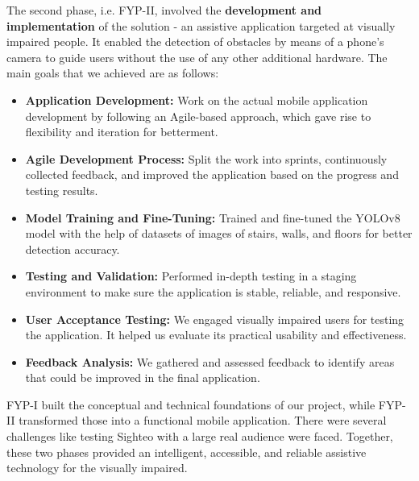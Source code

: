 \documentclass{FastFyp}
\begin{document}
The second phase, i.e. FYP-II, involved the \textbf{development and implementation} of the solution - an assistive application targeted at visually impaired people. It enabled the detection of obstacles by means of a phone's camera to guide users without the use of any other additional hardware. The main goals that we achieved are as follows:

\begin{itemize}
    \item \textbf{Application Development:}
    Work on the actual mobile application development by following an Agile-based approach, which gave rise to flexibility and iteration for betterment.
    \item \textbf{Agile Development Process:}
    Split the work into sprints, continuously collected feedback, and improved the application based on the progress and testing results.
    \item \textbf{Model Training and Fine-Tuning:}
    Trained and fine-tuned the YOLOv8 model with the help of datasets of images of stairs, walls, and floors for better detection accuracy.
    \item \textbf{Testing and Validation:}
     Performed in-depth testing in a staging environment to make sure the application is stable, reliable, and responsive.
     \item \textbf{User Acceptance Testing:}
     We engaged visually impaired users for testing the application. It helped us evaluate its practical usability and effectiveness.
     \item \textbf{Feedback Analysis:}
     We gathered and assessed feedback to identify areas that could be improved in the final application.
\end{itemize}

FYP-I built the conceptual and technical foundations of our project, while FYP-II transformed those into a functional mobile application. There were several challenges like testing Sighteo with a large real audience were faced. Together, these two phases provided an intelligent, accessible, and reliable assistive technology for the visually impaired.

{

}
\end{document}
